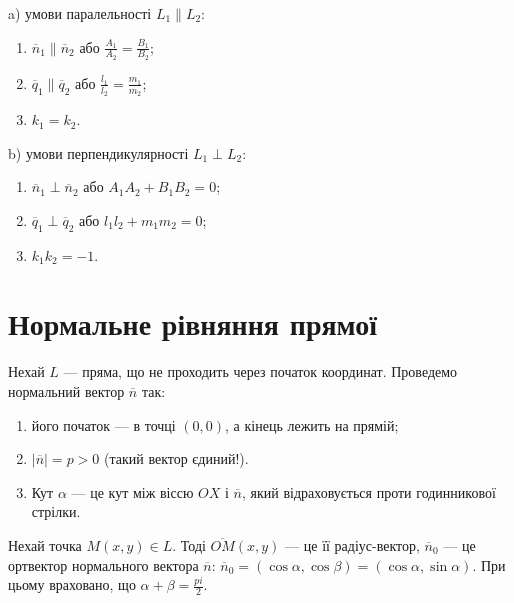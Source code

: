 a) умови паралельності $L_1 \parallel L_2$:

\begin{enumerate}
	\item $\overline{n}_1 \parallel \overline{n}_2$ або $\frac{A_1}{A_2} = \frac{B_1}{B_2}$;
	\item $\overline{q}_1 \parallel \overline{q}_2$ або $\frac{l_1}{l_2} = \frac{m_1}{m_2}$;
	\item $k_1 = k_2$.
\end{enumerate}

b) умови перпендикулярності $L_1 \perp L_2$:

\begin{enumerate}
	\item $\overline{n}_1 \perp \overline{n}_2$ або $A_1A_2 + B_1B_2 = 0$;
	\item $\overline{q}_1 \perp \overline{q}_2$ або $l_1l_2 + m_1m_2 = 0$;
	\item $k_1k_2 = -1$.
\end{enumerate}

\section{Нормальне рівняння прямої}

Нехай $L$ --- пряма, що не проходить через початок координат. Проведемо
нормальний вектор $\overline{n}$ так:
\begin{enumerate}
	\item його початок --- в точці $(0,0)$, а кінець лежить на прямій;
	\item $|\overline{n}| = p>0$ (такий вектор єдиний!).
	\item Кут $\alpha$ --- це кут між віссю $OX$ і $\overline{n}$, який відраховується проти годинникової стрілки.
\end{enumerate}

Нехай точка $M(x,y) \in L$. Тоді $\overline{OM}(x,y)$ --- це її радіус-вектор, $\overline{n}_0$ --- це ортвектор
нормального вектора $\overline{n}$: $\overline{n}_0 = (\cos\alpha,\cos\beta) = (\cos\alpha,\sin\alpha)$. При
цьому враховано, що $\alpha + \beta = \frac{pi}{2}$.

